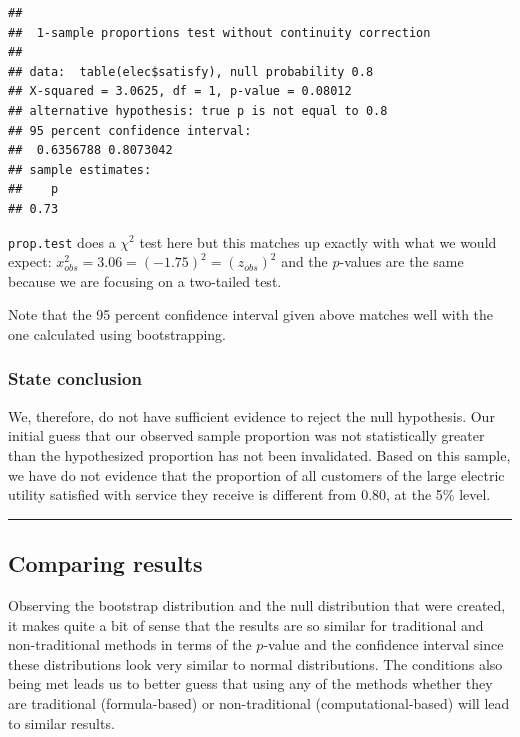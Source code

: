 \documentclass[]{tufte-book}
\let\oldrule=\rule
\renewcommand{\rule}[1]{\oldrule{\linewidth}}
\begin{document}
\begin{verbatim}
## 
##  1-sample proportions test without continuity correction
## 
## data:  table(elec$satisfy), null probability 0.8
## X-squared = 3.0625, df = 1, p-value = 0.08012
## alternative hypothesis: true p is not equal to 0.8
## 95 percent confidence interval:
##  0.6356788 0.8073042
## sample estimates:
##    p 
## 0.73
\end{verbatim}

\texttt{prop.test} does a \(\chi^2\) test here but this matches up
exactly with what we would expect:
\(x^2_{obs} = 3.06 = (-1.75)^2 = (z_{obs})^2\) and the \(p\)-values are
the same because we are focusing on a two-tailed test.

Note that the 95 percent confidence interval given above matches well
with the one calculated using bootstrapping.

\subsubsection{State conclusion}\label{state-conclusion-1}

We, therefore, do not have sufficient evidence to reject the null
hypothesis. Our initial guess that our observed sample proportion was
not statistically greater than the hypothesized proportion has not been
invalidated. Based on this sample, we have do not evidence that the
proportion of all customers of the large electric utility satisfied with
service they receive is different from 0.80, at the 5\% level.

\begin{center}\rule{0.5\linewidth}{\linethickness}\end{center}

\subsection{Comparing results}\label{comparing-results-1}

Observing the bootstrap distribution and the null distribution that were
created, it makes quite a bit of sense that the results are so similar
for traditional and non-traditional methods in terms of the \(p\)-value
and the confidence interval since these distributions look very similar
to normal distributions. The conditions also being met leads us to
better guess that using any of the methods whether they are traditional
(formula-based) or non-traditional (computational-based) will lead to
similar results.
\end{document}
